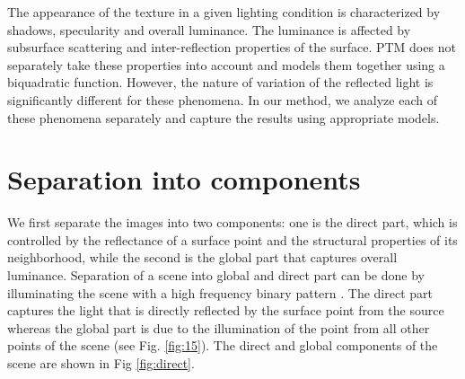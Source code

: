 The appearance of the texture in a given lighting condition is characterized by
shadows, specularity and overall luminance. The luminance is affected by
subsurface scattering and inter-reflection properties of the surface. PTM does
not separately take these properties into account and models them together using
a biquadratic function. However, the nature of variation of the reflected light
is significantly different for these phenomena.
In our method, we analyze each of these phenomena separately and capture the
results using appropriate models. 
\section{Separation into components}
We first separate the images into two components: one is the direct part, which is controlled by the reflectance of a
surface point and the structural properties of its neighborhood, while the
second is the global part that captures overall luminance. 
Separation of a scene into global and direct part can be done by illuminating the scene with a high
frequency binary pattern \cite{chap3-1}. The direct part captures the light that is
directly reflected by the surface point from the source whereas the global part
is due to the illumination of the point from all other points of the scene (see Fig. \ref{fig:15}).
The direct and global components of the scene are shown in Fig \ref{fig:direct}.

